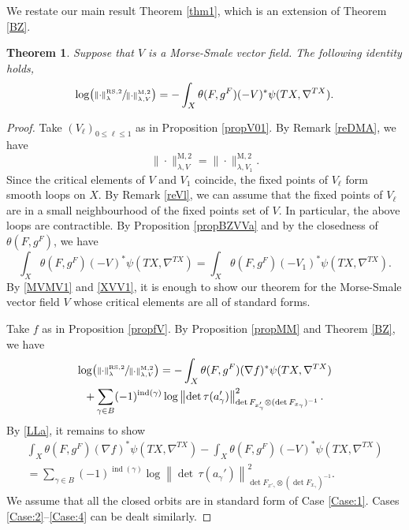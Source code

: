 \documentclass[11pt]{article}
\numberwithin{equation}{section}
\newcommand{\rM}{\mathrm{M}}
\newcommand{\RS}{\mathrm{RS}}
\theoremstyle{plain}
\newtheorem{thm}[lem]{Theorem}
\theoremstyle{definition}
\theoremstyle{remark}
\DeclareMathOperator{\ind}{ind}
\let\l\leqslant
\begin{document}
We restate our main
result Theorem \ref{thm1}, which is an extension of Theorem \ref{BZ}.
\begin{thm}\label{Thm1}
Suppose that $V$ is a Morse-Smale vector field. The following identity holds,
\begin{equation*}
\log\bigl(\sfrac{\|{\cdot}\|^{\RS,2}_{\lambda}}{\|{\cdot}\|^{\rM,2}_{\lambda,V}}\bigr)=-\int_{X}\theta(F,g^{F})(-V)^{*}\psi(TX,\nabla^{TX}).
\end{equation*}
\end{thm}
\begin{proof}
Take $(V_{\ell})_{0\l \ell\l 1}$ as in Proposition
\ref{propV01}.
By Remark \ref{reDMA}, we have
\begin{equation}\label{MVMV1}
\|{\cdot}\|^{\rM,2}_{\lambda,V}=\|{\cdot}\|^{\rM,2}_{\lambda,V_{1}}.
\end{equation}
Since the critical elements of $V$ and $V_{1}$ coincide, the fixed points of $V_{\ell}$ form smooth loops on $X$. By Remark \ref{reVl}, we can assume that the fixed points of $V_{\ell}$ are in a small neighbourhood of
the fixed points set of $V$. In particular, the above loops are
contractible. By Proposition \ref{propBZVVa} and by the closedness of $\theta(F,g^{F})$, we have
\begin{equation}\label{XVV1}
\int_{X}\theta(F,g^{F})(-V)^{*}\psi(TX,
\nabla^{TX})=\int_{X}\theta(F,g^{F})(-V_{1})^{*}\psi(TX, \nabla^{TX}).
\end{equation}
By \eqref{MVMV1} and \eqref{XVV1}, it is enough to show our theorem
for the Morse-Smale vector field $V$ whose critical elements are all
of standard forms.

Take $f$ as in Proposition
\ref{propfV}.
By Proposition \ref{propMM} and Theorem \ref{BZ}, we have
\begin{multline}\label{LLa}
\log\bigl(\sfrac{\|{\cdot}\|^{\RS,2}_{\lambda}}{\|{\cdot}\|^{\rM,2}_{\lambda,V}}\bigr)=-\int_{X}\theta(F,g^{F})(\nabla f)^{*}\psi(TX, \nabla ^{TX})\\
+\sum_{\gamma\in
B}(-1)^{\ind(\gamma)}\log
\left\|{\det\,}\tau(a_{\gamma}')\right\|^{2}_{\det
F_{x'_{\gamma}}\otimes (\det
F_{x_{\gamma}})^{-1}}.
\end{multline}
By \eqref{LLa}, it remains to show
\begin{multline}\label{eqaaa}
\int_{X}\theta(F,g^{F})(\nabla
f)^{*}\psi(TX,
\nabla^{TX})-\int_{X}\theta(F,g^{F})(-V)^{*}\psi(TX,\nabla^{TX})\\
=\sum_{\gamma\in
B}(-1)^{\ind(\gamma)}\log
\left\|{\det\,}\tau(a_{\gamma}')\right\|^{2}_{\det
F_{x'_{\gamma}}\otimes (\det
F_{x_{\gamma}})^{-1}}.
\end{multline}
We assume that all the closed orbits are in standard form
of Case \ref{Case:1}. Cases \ref{Case:2}--\ref{Case:4} can be dealt similarly.


\end{proof}
\end{document}

